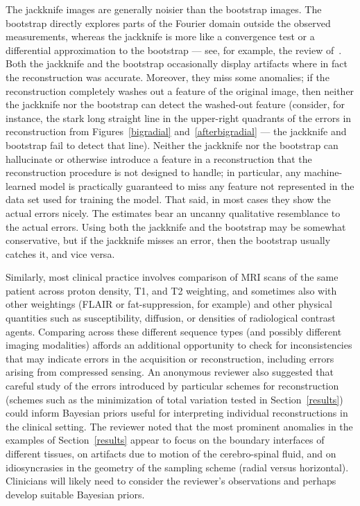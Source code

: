 \documentclass[article]{jdssv}
\begin{document}
The jackknife images are generally noisier than the bootstrap images.
The bootstrap directly explores parts of the Fourier domain
outside the observed measurements, whereas the jackknife is more
like a convergence test or a differential approximation to the bootstrap ---
see, for example, the review of~\citet{efron-tibshirani}.
Both the jackknife and the bootstrap occasionally display artifacts
where in fact the reconstruction was accurate.
Moreover, they miss some anomalies;
if the reconstruction completely washes out a feature of the original image,
then neither the jackknife nor the bootstrap can detect the washed-out feature
(consider, for instance, the stark long straight line
in the upper-right quadrants of the errors in reconstruction
from Figures~\ref{bigradial} and~\ref{afterbigradial}
--- the jackknife and bootstrap fail to detect that line).
Neither the jackknife nor the bootstrap can hallucinate or otherwise introduce
a feature in a reconstruction that the reconstruction procedure is not designed
to handle; in particular, any machine-learned model is practically guaranteed
to miss any feature not represented in the data set used for training
the model. That said, in most cases they show the actual errors nicely.
The estimates bear an uncanny qualitative resemblance to the actual errors.
Using both the jackknife and the bootstrap may be somewhat conservative,
but if the jackknife misses an error, then the bootstrap usually catches it,
and vice versa.

Similarly, most clinical practice involves comparison of MRI scans
of the same patient across proton density, T1, and T2 weighting,
and sometimes also with other weightings (FLAIR or fat-suppression,
for example) and other physical quantities such as susceptibility, diffusion,
or densities of radiological contrast agents.
Comparing across these different sequence types (and possibly different
imaging modalities) affords an additional opportunity to check
for inconsistencies that may indicate errors in the acquisition
or reconstruction, including errors arising from compressed sensing.
An anonymous reviewer also suggested that careful study of the errors
introduced by particular schemes for reconstruction (schemes such as
the minimization of total variation tested in Section~\ref{results})
could inform Bayesian priors useful for interpreting
individual reconstructions in the clinical setting.
The reviewer noted that the most prominent anomalies in the examples
of Section~\ref{results} appear to focus on the boundary interfaces
of different tissues, on artifacts due to motion of the cerebro-spinal fluid,
and on idiosyncrasies in the geometry of the sampling scheme
(radial versus horizontal).
Clinicians will likely need to consider the reviewer's observations
and perhaps develop suitable Bayesian priors.
\end{document}
